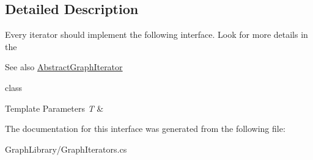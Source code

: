 \subsection{Detailed Description}
Every iterator should implement the following interface. Look for more details in the \begin{DoxySeeAlso}{See also}
\hyperlink{class_graph_library_1_1_abstract_graph_iterator}{Abstract\+Graph\+Iterator}


\end{DoxySeeAlso}
class 


\begin{DoxyTemplParams}{Template Parameters}
{\em T} & \\
\hline
\end{DoxyTemplParams}


The documentation for this interface was generated from the following file\+:\begin{DoxyCompactItemize}
\item 
Graph\+Library/Graph\+Iterators.\+cs\end{DoxyCompactItemize}
